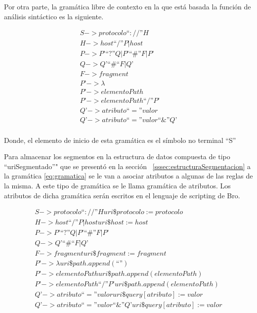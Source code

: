 Por otra parte, la gramática libre de contexto en la que está basada la función de análisis sintáctico es la siguiente.

\begin{equation}\label{eq:gramatica}
\begin{aligned}
S -> protocolo “ :// ” H  \\
H -> host “/” P | host \\
P -> P’ “?” Q | P’ “\#” F | P’ \\
Q -> Q’ “\#“ F | Q’ \\
F -> fragment \\
P’ -> \lambda \\
P’ ->  elementoPath \\
P’ -> elementoPath “/” P’ \\
Q’ -> atributo “=” valor \\
Q’ -> atributo “=” valor “\&” Q’ \\
\end{aligned}
\end{equation}

Donde, el elemento de inicio de esta gramática es el símbolo no terminal “S”

Para almacenar los segmentos en la estructura de datos compuesta de tipo “uriSegmentado”" que se presentó en la sección ~\ref{sssec:estructuraSegmentacion} a la gramática \ref{eq:gramatica} se le van a asociar atributos a algunas de las reglas de la misma. A este tipo de gramática se le llama gramática de atributos. Los atributos de dicha gramática serán escritos en el lenguaje de scripting de Bro.

\begin{equation}\label{eq:gramaticaAtributos}
\begin{aligned}
S -> protocolo “ :// ” H { uri\$protocolo := protocolo } \\
H -> host “/” P | host { uri\$host := host  } \\
P -> P’ “?” Q | P’ “\#” F | P’ \\
Q -> Q’ “\#“ F | Q’ \\
F -> fragment { uri\$fragment := fragment } \\
P’ -> \lambda  { uri\$path.append(“”) } \\
P’ ->  elementoPath { uri\$path.append(elementoPath) } \\
P’ -> elementoPath “/” P’ { uri\$path.append(elementoPath) } \\
Q’ -> atributo “=” valor { uri\$query[atributo] := valor } \\
Q’ -> atributo “=” valor “\&” Q’ { uri\$query[atributo] := valor } \\
\end{aligned}
\end{equation}

